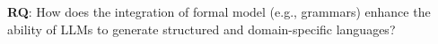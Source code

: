 \textbf{RQ}: How does the integration of formal model (e.g., grammars) enhance the ability of LLMs to generate structured and domain-specific languages?

%
%
%
